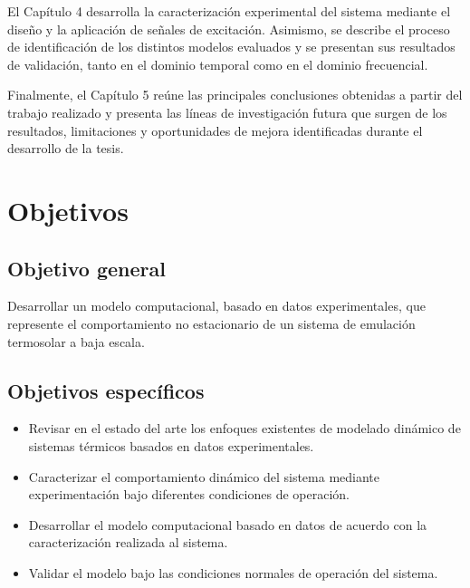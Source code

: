\documentclass[11pt]{report}
\begin{document}
El Capítulo 4 desarrolla la caracterización experimental del sistema mediante el diseño y la aplicación de señales de excitación. Asimismo, se describe el proceso de identificación de los distintos modelos evaluados y se presentan sus resultados de validación, tanto en el dominio temporal como en el dominio frecuencial.

Finalmente, el Capítulo 5 reúne las principales conclusiones obtenidas a partir del trabajo realizado y presenta las líneas de investigación futura que surgen de los resultados, limitaciones y oportunidades de mejora identificadas durante el desarrollo de la tesis.
    

\section{Objetivos}

\subsection{Objetivo general}
Desarrollar un modelo computacional, basado en datos experimentales, que represente el comportamiento no estacionario de un sistema de emulación termosolar a baja escala.

\subsection{Objetivos específicos}

\begin{itemize}
\item Revisar en el estado del arte los enfoques existentes de modelado dinámico de sistemas térmicos basados en datos experimentales.
\item Caracterizar el comportamiento dinámico del sistema mediante experimentación bajo diferentes condiciones de operación.
\item Desarrollar el modelo computacional basado en datos de acuerdo con la caracterización realizada al sistema.
\item Validar el modelo bajo las condiciones normales de operación del sistema. 
\end{itemize}
\end{document}

